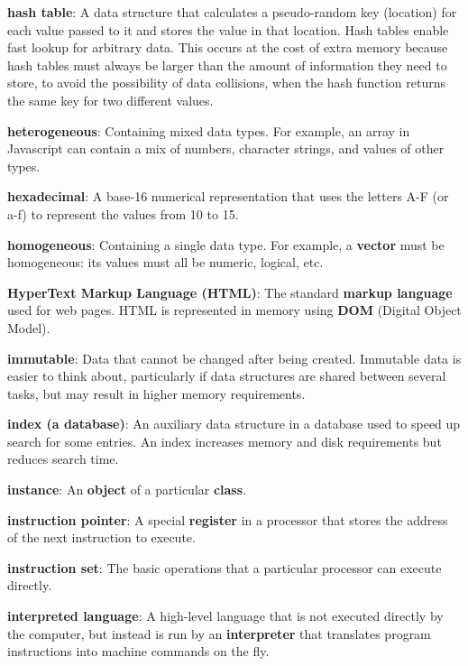 \documentclass{scrbook}
\newcommand{\glosskey}[1]{\textbf{#1}}
\begin{document}
\noindent \textbf{\glosskey{hash table}}: 
A data structure that calculates a pseudo-random key (location) for each value passed to it and stores the value in that location. Hash tables enable fast lookup for arbitrary data. This occurs at the cost of extra memory because hash tables must always be larger than the amount of information they need to store, to avoid the possibility of data collisions, when the hash function returns the same key for two different values.


\noindent \textbf{\glosskey{heterogeneous}}: 
Containing mixed data types. For example, an array in Javascript can contain a mix of numbers, character strings, and values of other types.


\noindent \textbf{\glosskey{hexadecimal}}: 
A base-16 numerical representation that uses the letters A-F (or a-f) to represent the values from 10 to 15.


\noindent \textbf{\glosskey{homogeneous}}: 
Containing a single data type. For example, a \glosskey{vector} must be homogeneous: its values must all be numeric, logical, etc.


\noindent \textbf{\glosskey{HyperText Markup Language} (HTML)}: 
The standard \glosskey{markup language} used for web pages. HTML is represented in memory using \glosskey{DOM} (Digital Object Model).


\noindent \textbf{\glosskey{immutable}}: 
Data that cannot be changed after being created. Immutable data is easier to think about, particularly if data structures are shared between several tasks, but may result in higher memory requirements.


\noindent \textbf{\glosskey{index (a database)}}: 
An auxiliary data structure in a database used to speed up search for some entries. An index increases memory and disk requirements but reduces search time.


\noindent \textbf{\glosskey{instance}}: 
An \glosskey{object} of a particular \glosskey{class}.


\noindent \textbf{\glosskey{instruction pointer}}: 
A special \glosskey{register} in a processor that stores the address of the next instruction to execute.


\noindent \textbf{\glosskey{instruction set}}: 
The basic operations that a particular processor can execute directly.


\noindent \textbf{\glosskey{interpreted language}}: 
A high-level language that is not executed directly by the computer, but instead is run by an \glosskey{interpreter} that translates program instructions into machine commands on the fly.
\end{document}
